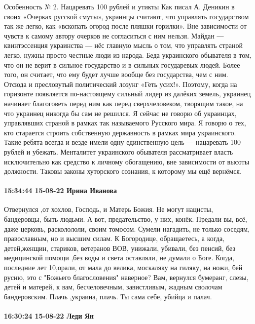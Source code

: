 Особенность № 2. Нацаревать 100 рублей и утикты Как писал А. Деникин в своих
«Очерках русской смуты», украинцы считают, что управлять государством так же
легко, как «вскопать огород после пляшки горилки». Вне зависимости от чувств к
самому автору очерков не согласиться с ним нельзя. Майдан ― квинтэссенция
украинства ― нёс главную мысль о том, что управлять страной легко, нужны просто
честные люди из народа. Беда украинского обывателя в том, что он не верит в
сильное государство и в сильных государевых людей. Более того, он считает, что
ему будет лучше вообще без государства, чем с ним. Отсюда и пресловутый
политический лозунг «Геть усих!». Поэтому, когда на горизонте появляется
по-настоящему сильный лидер из далёких земель, украинец начинает благоговеть
перед ним как перед сверхчеловеком, творящим такое, на что украинец никогда бы
сам не решился. Я сейчас не говорю об украинцах, управлявших страной в рамках
так называемого Русского мира. Я говорю о тех, кто старается строить
собственную державность в рамках мира украинского. Такие ребята всегда и везде
имели одну-единственную цель ― нацаревать 100 рублей и убежать. Менталитет
украинского обывателя рассматривает власть исключительно как средство к личному
обогащению, вне зависимости от высоты должности. Таковы законы хуторского
сознания, к которому мы ещё вернёмся. 

\paragraph{15:34:44 15-08-22 Ирина Иванова}

Отвернулся ,от хохлов, Господь, и Матерь Божия. Не могут нацисты, бандеровцы,
быть людьми. А вот, предательство, у них, конёк. Предали вы, всё, даже церковь,
расколололи, своим томосом. Сумели нагадить, не только соседям, православным,
но и высшим силам. К Богородице, обращаетесь, а когда, детей,женщин, стариков,
ветеранов ВОВ, унижали, убивали, без пенсий, без медицинской помощи ,без воды и
света оставляли, не думали о Боге. Когда, последние лет 10,орали, от мала до
велика, москаляку на гиляку, на ножи, бей русню, это с "Божьего благословения"
наверное? Вам, вернулся бумеранг, слезы, детей и матерей, к вам, бесчеловечным,
завистливым, жадным сволочам бандеровским. Плачь ,украина, плачь. Ты сама себе,
убийца и палач.

\paragraph{16:30:24 15-08-22 Леди Ян}

